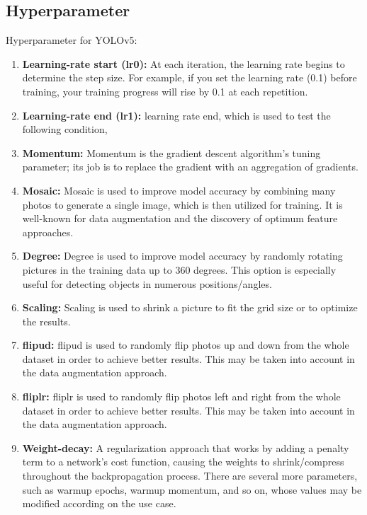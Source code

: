 \subsection{Hyperparameter}
Hyperparameter for YOLOv5: \cite{EasyOCR:2018}
\begin{enumerate}
	
	\item \textbf{Learning-rate start (lr0): }At each iteration, the learning rate begins to determine the step size. For example, if you set the learning rate (0.1) before training, your training progress will rise by 0.1 at each repetition.
	\item \textbf{Learning-rate end (lr1): }learning rate end, which is used to test the following condition,
	\item \textbf{Momentum: }Momentum is the gradient descent algorithm's tuning parameter; its job is to replace the gradient with an aggregation of gradients.
	\item \textbf{Mosaic: }Mosaic is used to improve model accuracy by combining many photos to generate a single image, which is then utilized for training. It is well-known for data augmentation and the discovery of optimum feature approaches.
	\item \textbf{Degree: }Degree is used to improve model accuracy by randomly rotating pictures in the training data up to 360 degrees. This option is especially useful for detecting objects in numerous positions/angles. 
	\item \textbf{Scaling: }Scaling is used to shrink a picture to fit the grid size or to optimize the results. 
	\item \textbf{flipud: }flipud is used to randomly flip photos up and down from the whole dataset in order to achieve better results. This may be taken into account in the data augmentation approach. 
	\item \textbf{fliplr: }fliplr is used to randomly flip photos left and right from the whole dataset in order to achieve better results. This may be taken into account in the data augmentation approach.
	\item \textbf{Weight-decay: }A regularization approach that works by adding a penalty term to a network's cost function, causing the weights to shrink/compress throughout the backpropagation process. 
	There are several more parameters, such as warmup epochs, warmup momentum, and so on, whose values may be modified according on the use case.
\end{enumerate}

